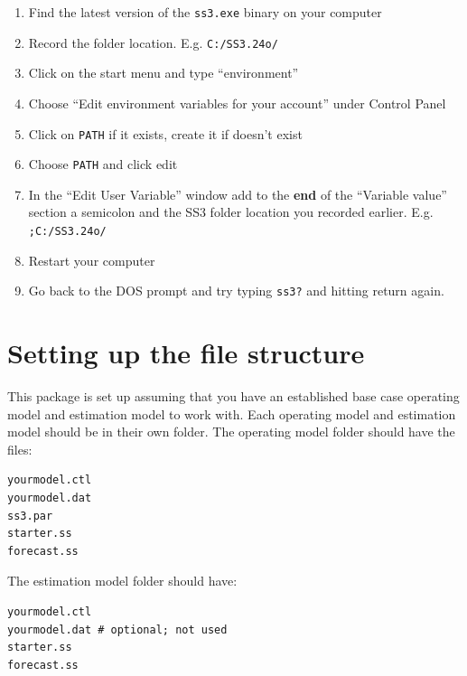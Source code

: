 \documentclass[12pt]{article}
\begin{document}
\begin{enumerate}
  \item Find the latest version of the \texttt{ss3.exe} binary on your computer
  \item Record the folder location. E.g. \texttt{C:/SS3.24o/}
  \item Click on the start menu and type ``environment''
  \item Choose ``Edit environment variables for your account'' under Control 
    Panel
  \item Click on \texttt{PATH} if it exists, create it if doesn't exist
  \item Choose \texttt{PATH} and click edit
  \item In the ``Edit User Variable'' window add to the \textbf{end} of the 
    ``Variable value'' section a semicolon and the SS3 folder location you 
    recorded earlier. E.g. \texttt{;C:/SS3.24o/}
  \item Restart your computer
  \item Go back to the DOS prompt and try typing \texttt{ss3?} and hitting 
    return again.
\end{enumerate}


\section*{Setting up the file structure}
This package is set up assuming that you have an established base case 
operating model and estimation model to work with. Each operating model and 
estimation model should be in their own folder. The operating model folder 
should have the files:
\begin{verbatim}
yourmodel.ctl
yourmodel.dat
ss3.par
starter.ss
forecast.ss
\end{verbatim}

\noindent
The estimation model folder should have:

\begin{verbatim}
yourmodel.ctl
yourmodel.dat # optional; not used
starter.ss
forecast.ss
\end{verbatim}
\end{document}
